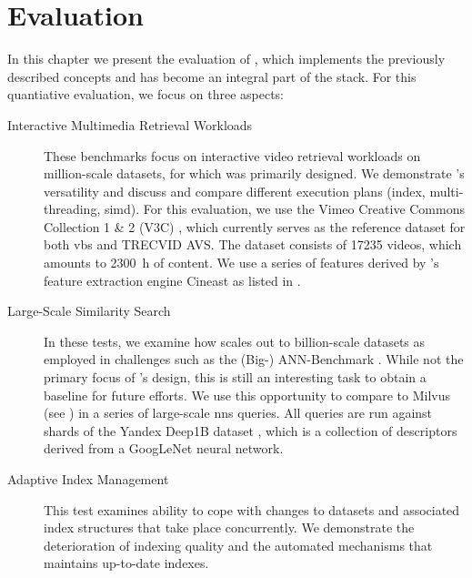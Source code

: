 \chapter{Evaluation}
\label{chapter:evaluation}

In this chapter we present the evaluation of \cottontail{} \cite{Gasser:2020Cottontail}, which implements the previously described concepts and has become an integral part of the \vitrivr{} \cite{Rossetto:2016Vitrivr,Gasser:2019Towards,Gasser:2019Multimodal} stack. For this quantiative evaluation, we focus on three aspects:

\begin{description}
    \item[Interactive Multimedia Retrieval Workloads] These benchmarks focus on interactive video retrieval workloads on million-scale datasets, for which \cottontail{} was primarily designed. We demonstrate \cottontail{}'s versatility and discuss and compare different execution plans (index, multi-threading, \acrshort{simd}). For this evaluation, we use the Vimeo Creative Commons Collection 1 \& 2 (V3C) \cite{Berns:2019V3C1,Rossetto:2021Insights}, which currently serves as the reference dataset for both \acrshort{vbs} and TRECVID AVS. The dataset consists of 17235 videos, which amounts to \SI{2300}{\hour} of content. We use a series of features derived by \vitrivr{}'s feature extraction engine Cineast as listed in .
    \item[Large-Scale Similarity Search] In these tests, we examine how \cottontail{} scales out to billion-scale datasets as employed in challenges such as the (Big-) ANN-Benchmark \cite{Aumueller:2017ANN,Simhadri:2022Results}. While not the primary focus of \cottontail{}'s design, this is still an interesting task to obtain a baseline for future efforts. We use this opportunity to compare \cottontail{} to Milvus (see ) in a series of large-scale \acrshort{nns} queries. All queries are run against shards of the Yandex Deep1B dataset \cite{Babenko:2016Efficient}, which is a collection of descriptors derived from a GoogLeNet \cite{Szegedy:2015Going} neural network.
    \item[Adaptive Index Management] This test examines \cottontail{} ability to cope with changes to datasets and associated index structures that take place concurrently. We demonstrate the deterioration of indexing quality and the automated mechanisms that maintains up-to-date indexes.
\end{description}

